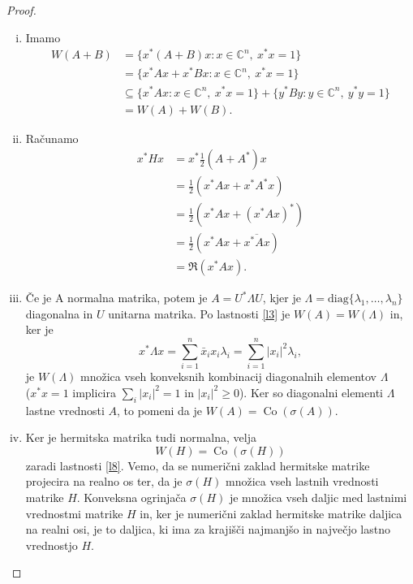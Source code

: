 \documentclass[12pt,a4paper]{amsart}
\theoremstyle{definition}
\theoremstyle{plain}
\newcommand{\Co}{\operatorname{Co}} %
\newcommand{\C}{\mathbb C}
\begin{document}
\begin{proof}
\begin{enumerate}[(i)]
\item Imamo
\begin{align*}
W(A+B)&=\{x^\ast(A+B)x\! : x\in \C^n,\ x^\ast x=1\}\\
& = \{x^\ast Ax +x^\ast Bx\! : x\in \C^n,\ x^\ast x=1\}\\
& \subseteq \{x^\ast Ax\! : x\in \C^n,\ x^\ast x=1\}+\{y^\ast By\! : y\in \C^n,\ y^\ast y=1\}\\
& =W(A) + W(B).
\end{align*}
\item Računamo
\begin{align*}
x^\ast Hx &= x^\ast \frac{1}{2}(A+A^\ast)x \\
 &=\frac{1}{2} (x^\ast Ax +x^\ast A^\ast x) \\
 &=\frac{1}{2}(x^\ast Ax +(x^\ast Ax)^\ast) \\
 &= \frac{1}{2}(x^\ast Ax +\overline{x^\ast Ax}) \\
 &= \Re (x^\ast Ax).
\end{align*}

\item Če je A normalna matrika, potem je $A=U^\ast \Lambda U$, kjer je $\Lambda = \text{diag}\{\lambda_1, \dots, \lambda_n\}$ diagonalna in $U$ unitarna matrika. 
Po lastnosti \ref{l3} je $W(A)=W(\Lambda)$ in, ker je $$x^\ast \Lambda x = \sum_{i=1}^{n} \bar{x}_i x_i\lambda_i = \sum_{i=1}^{n} |x_i|^2 \lambda_i ,$$ 
je $W(\Lambda)$ množica vseh konveksnih kombinacij diagonalnih elementov $\Lambda$\\($x^\ast x=1$ implicira $ \sum_{i} |x_i|^2 =1$ in $|x_i|^2 \geq 0$). 
Ker so diagonalni elementi $\Lambda$ lastne vrednosti $A$, to pomeni da je $W(A) =\Co(\sigma(A))$.

\item Ker je hermitska matrika tudi normalna, velja $$W(H) = \Co(\sigma(H))$$ zaradi lastnosti \ref{l8}.
Vemo, da se numerični zaklad hermitske matrike projecira na realno os ter, da je $\sigma(H)$ množica vseh lastnih vrednosti matrike $H$. 
Konveksna ogrinjača $\sigma(H)$ je množica vseh daljic med lastnimi vrednostmi matrike $H$ in, ker je numerični zaklad hermitske matrike daljica na realni osi, je to daljica, ki ima za krajišči najmanjšo in največjo lastno vrednostjo $H$.
\end{enumerate}
\end{proof}
\end{document}
